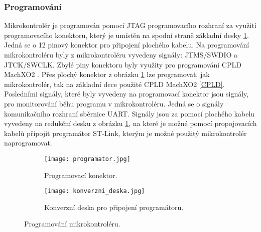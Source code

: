 	\subsubsection{Programování}
	Mikrokontrolér je programován pomocí JTAG programovacího rozhraní za využití programovacího konektoru, který je umístěn na spodní straně základní desky \ref{fig:programator}. Jedná se o 12 pinový konektor pro připojení plochého kabelu. Na programování mikrokontroléru byly z mikrokontroléru vyvedeny signály: JTMS/SWDIO a JTCK/SWCLK. Zbylé piny konektoru byly využity pro programování CPLD MachXO2 \cite{CPLD}. Přes plochý konektor z obrázku \ref{fig:programator} lze programovat, jak mikrokontrolér, tak na základní dece použité CPLD MachXO2 \ref{CPLD}. Posledními signály, které byly vyvedeny na programovací konektor jsou signály, pro monitorování běhu programu v mikrokontroléru. Jedná se o signály komunikačního rozhraní sběrnice UART. Signály jsou za pomocí plochého kabelu vyvedeny na redukční desku z obrázku \ref{fig:programator}, na které je možné pomocí propojovacích kabelů připojit programátor ST-Link, kterým je možné použitý mikrokontrolér naprogramovat. 
\begin{figure}[h!]
	\begin{subfigure}{0.5\textwidth}
		\centering
		\captionsetup{justification=centering}
		\texttt{[image: programator.jpg]}
		\caption{Programovací konektor.} 
		\label{fig:programator}
	\end{subfigure}
	\begin{subfigure}{0.5\textwidth}
		\centering
		\captionsetup{justification=centering}
		\texttt{[image: konverzni\_deska.jpg]}
		\caption{Konverzní deska pro připojení programátoru.} 
		\label{fig:konverzni_deska}
	\end{subfigure}
	\caption{Programování mikrokontroléru.}
	\label{fig:programovani}
\end{figure} 

